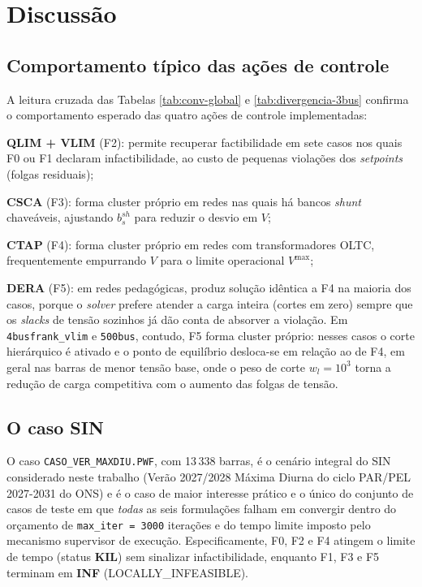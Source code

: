 \section{Discussão}
\label{sec:discussao}

\subsection{Comportamento típico das ações de controle}
\label{subsec:disc-controles}

A leitura cruzada das Tabelas \ref{tab:conv-global} e \ref{tab:divergencia-3bus} confirma o comportamento esperado das quatro ações de controle implementadas:

\begin{alineascomponto}
    \item \textbf{QLIM + VLIM} (F2): permite recuperar factibilidade em sete casos nos quais F0 ou F1 declaram infactibilidade, ao custo de pequenas violações dos \textit{setpoints} (folgas residuais);
    \item \textbf{CSCA} (F3): forma cluster próprio em redes nas quais há bancos \textit{shunt} chaveáveis, ajustando $b^{sh}_s$ para reduzir o desvio em $V$;
    \item \textbf{CTAP} (F4): forma cluster próprio em redes com transformadores OLTC, frequentemente empurrando $V$ para o limite operacional $V^{\max}$;
    \item \textbf{DERA} (F5): em redes pedagógicas, produz solução idêntica a F4 na maioria dos casos, porque o \textit{solver} prefere atender a carga inteira (cortes em zero) sempre que os \textit{slacks} de tensão sozinhos já dão conta de absorver a violação. Em \texttt{4busfrank\_vlim} e \texttt{500bus}, contudo, F5 forma cluster próprio: nesses casos o corte hierárquico é ativado e o ponto de equilíbrio desloca-se em relação ao de F4, em geral nas barras de menor tensão base, onde o peso de corte $w_l = 10^3$ torna a redução de carga competitiva com o aumento das folgas de tensão.
\end{alineascomponto}

\subsection{O caso SIN}
\label{subsec:sin}

O caso \texttt{CASO\_VER\_MAXDIU.PWF}, com 13\,338 barras, é o cenário integral do SIN considerado neste trabalho (Verão 2027/2028 Máxima Diurna do ciclo PAR/PEL 2027-2031 do ONS) e é o caso de maior interesse prático e o único do conjunto de casos de teste em que \emph{todas} as seis formulações falham em convergir dentro do orçamento de \texttt{max\_iter = 3000} iterações e do tempo limite imposto pelo mecanismo supervisor de execução. Especificamente, F0, F2 e F4 atingem o limite de tempo (status \textbf{KIL}) sem sinalizar infactibilidade, enquanto F1, F3 e F5 terminam em \textbf{INF} (LOCALLY\_INFEASIBLE).

